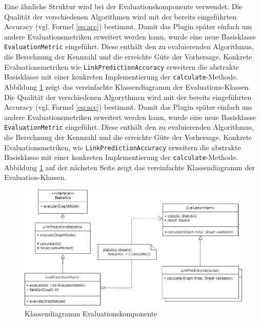Eine ähnliche Struktur wird bei der Evaluationskomponente verwendet.
Die Qualität der verschiedenen Algorithmen wird mit der bereits eingeführten Accuracy (vgl. Formel \ref{eq:acc}) bestimmt.
Damit das Plugin später einfach um andere Evaluationsmetriken erweitert werden kann, wurde eine neue Basisklasse \texttt{EvaluationMetric} eingeführt.
Diese enthält den zu evaluierenden Algorithmus, die Berechnung der Kennzahl und die erreichte Güte der Vorhersage. Konkrete Evaluationsmetriken wie \texttt{LinkPredictionAccuracy} erweitern die abstrakte Basisklasse mit einer konkreten Implementierung der \texttt{calculate}-Methode.
Abbildung \ref{fig:class_eval} zeigt das vereinfachte Klassendiagramm der Evaluations-Klassen.
Die Qualität der verschiedenen Algorythmen wird mit der bereits eingeführten Accuracy (vgl. Formel \ref{eq:acc}) bestimmt.
Damit das Plugin später einfach um andere Evaluationsmetriken erweitert werden kann, wurde eine neue Basisklasse \texttt{EvaluationMetric} eingeführt.
Diese enthält den zu evaluierenden Algorithmus, die Berechnung der Kennzahl und die erreichte Güte der Vorhersage. Konkrete Evaluationsmetriken, wie \texttt{LinkPredictionAccuracy} erweitern die abstrakte Basisklasse mit einer konkreten Implementierung der \texttt{calculate}-Methode.
Abbildung \ref{fig:class_eval} auf der nächsten Seite zeigt das vereinfachte Klassendiagramm der Evaluation-Klassen.

\begin{figure}
    \centering
    \includegraphics[width=\linewidth]{resources/class_Evaluation.png}
    \caption{Klassendiagramm Evaluationskomponente}
    \label{fig:class_eval}
\end{figure}

